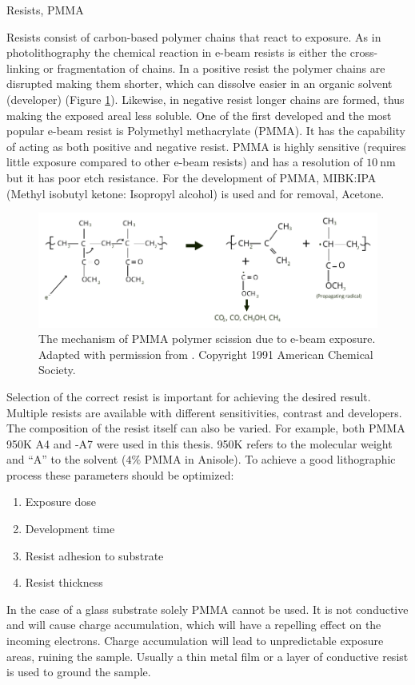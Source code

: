\documentclass[final]{jyflluk}
\begin{document}
Resists, PMMA

Resists consist of carbon-based polymer chains that react to exposure. As in photolithography the chemical reaction in e-beam resists is either the cross-linking or fragmentation of chains. In a positive resist the polymer chains are disrupted making them shorter, which can dissolve easier in an organic solvent (developer) (Figure \ref{fig:PMMA_chem}). Likewise, in negative resist longer chains are formed, thus making the exposed areal less soluble. One of the first developed and the most popular e-beam resist is Polymethyl methacrylate (PMMA). It has the capability of acting as both positive and negative resist. PMMA is highly sensitive (requires little exposure compared to other e-beam resists) and has a resolution of $\SI{10}{\nano \metre}$ but it has poor etch resistance. For the development of PMMA, MIBK:IPA (Methyl isobutyl ketone: Isopropyl alcohol) is used and for removal, Acetone. \cite{EBL_GOOD}

\begin{figure}[h]
    \centering
    \includegraphics[width=1.0\textwidth]{images/PMMA_chem_eq.pdf}
    \caption{The mechanism of PMMA polymer scission due to e-beam exposure. Adapted with permission from \cite{moore_degradation_1991}. Copyright 1991 American Chemical Society.}
    \label{fig:PMMA_chem}
\end{figure}

Selection of the correct resist is important for achieving the desired result. Multiple resists are available with different sensitivities, contrast and developers. The composition of the resist itself can also be varied. For example, both PMMA 950K A4 and -A7 were used in this thesis.  950K refers to the molecular weight and “A” to the solvent ($4 \percent$ PMMA in Anisole). To achieve a good lithographic process these parameters should be optimized:
\begin{enumerate}
    \renewcommand{\labelenumi}{\roman{enumi}} 
        \item Exposure dose
        \item Development time
        \item Resist adhesion to substrate
        \item Resist thickness
\end{enumerate}	
In the case of a glass substrate solely PMMA cannot be used. It is not conductive and  will cause charge accumulation, which will have a repelling effect on the incoming electrons. Charge accumulation will lead to unpredictable exposure areas, ruining the sample. Usually a thin metal film or a layer of conductive resist is used to ground the sample.
\end{document}

